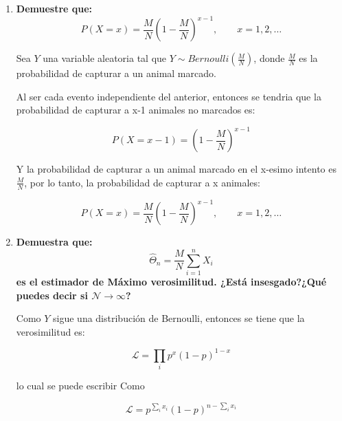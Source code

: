 \begin{enumerate}
    \item \textbf{Demuestre que:}
          \begin{equation*}
              P(X=x) = \frac{M}{N} \left (1-\frac{M}{N}\right )^{x-1}, \qquad x=1,2,\dots
          \end{equation*}

          Sea $Y$ una variable aleatoria tal que $Y\sim Bernoulli\left (\frac{M}{N}\right )$, donde $\frac{M}{N}$ es la probabilidad de capturar a un animal marcado.

          Al ser cada evento independiente del anterior, entonces se tendria que la probabilidad de capturar a x-1 animales no marcados es:

          \begin{equation}
              P(X=x-1) = \left (1-\frac{M}{N}\right )^{x-1}
          \end{equation}

          Y la probabilidad de capturar a un animal marcado en el x-esimo intento es $\frac{M}{N}$, por lo tanto, la probabilidad de capturar a x animales:

          \begin{equation*}
              P(X=x) = \frac{M}{N} \left (1-\frac{M}{N}\right )^{x-1}, \qquad x=1,2,\dots
          \end{equation*}

    \item \textbf{Demuestra que:}
          \begin{equation*}
              \hat{\Theta}_n = \frac{M}{N} \sum_{i=1}^n X_i
          \end{equation*}
          \textbf{es el estimador de Máximo verosimilitud. ¿Está insesgado?¿Qué puedes decir si $\mathcal{N}\rightarrow \infty$?}

          Como $Y$ sigue una distribución de Bernoulli, entonces se tiene que la verosimilitud es:

          \begin{equation*}
              \mathcal{L} = \prod_i p^x (1-p)^{1-x}
          \end{equation*}

          lo cual se puede escribir Como

          \begin{equation*}
              \mathcal{L} = p^{\sum_i x_i} (1-p)^{n-\sum_i x_i}
          \end{equation*}


\end{enumerate}
